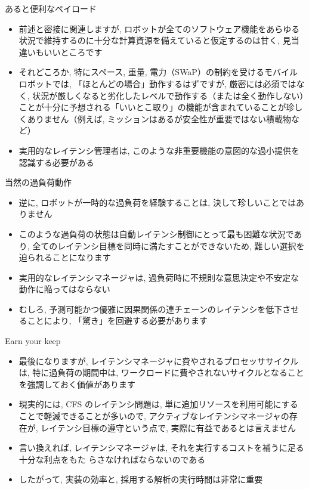 \begin{frame}{あると便利なペイロード}
    \begin{itemize}
        \item 前述と密接に関連しますが, ロボットが全てのソフトウェア機能をあらゆる状況で維持するのに十分な計算資源を備えていると仮定するのは甘く, 見当違いもいいところです
        \item それどころか, 特にスペース, 重量, 電力（SWaP）の制約を受けるモバイルロボットでは, 「ほとんどの場合」動作するはずですが, 厳密には必須ではなく, 状況が厳しくなると劣化したレベルで動作する（または全く動作しない）ことが十分に予想される「いいとこ取り」の機能が含まれていることが珍しくありません（例えば, ミッションはあるが安全性が重要ではない積載物など）
        \item 実用的なレイテンシ管理者は, このような非重要機能の意図的な過小提供を認識する必要がある
    \end{itemize}
\end{frame}

\begin{frame}{当然の過負荷動作}
    \begin{itemize}
        \item 逆に, ロボットが一時的な過負荷を経験することは, 決して珍しいことではありません
        \item このような過負荷の状態は自動レイテンシ制御にとって最も困難な状況であり, 全てのレイテンシ目標を同時に満たすことができないため, 難しい選択を迫られることになります
        \item 実用的なレイテンシマネージャは, 過負荷時に不規則な意思決定や不安定な動作に陥ってはならない
        \item むしろ, 予測可能かつ優雅に因果関係の連チェーンのレイテンシを低下させることにより, 「驚き」を回避する必要があります
    \end{itemize}
\end{frame}

\begin{frame}{Earn your keep}
    \begin{itemize}
        \item 最後になりますが, レイテンシマネージャに費やされるプロセッササイクルは, 特に過負荷の期間中は, ワークロードに費やされないサイクルとなることを強調しておく価値があります
        \item 現実的には, CFS のレイテンシ問題は, 単に追加リソースを利用可能にすることで軽減できることが多いので, アクティブなレイテンシマネージャの存在が, レイテンシ目標の遵守という点で, 実際に有益であるとは言えません
        \item 言い換えれば, レイテンシマネージャは, それを実行するコストを補うに足る十分な利点をもた らさなければならないのである
        \item したがって, 実装の効率と, 採用する解析の実行時間は非常に重要
    \end{itemize}
\end{frame}
